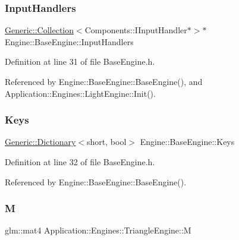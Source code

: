 \subsubsection{\texorpdfstring{Input\+Handlers}{InputHandlers}}
{\footnotesize\ttfamily \mbox{\hyperlink{classGeneric_1_1Collection}{Generic\+::\+Collection}}$<$Components\+::\+I\+Input\+Handler$\ast$$>$$\ast$ Engine\+::\+Base\+Engine\+::\+Input\+Handlers\hspace{0.3cm}{\ttfamily [inherited]}}



Definition at line 31 of file Base\+Engine.\+h.



Referenced by Engine\+::\+Base\+Engine\+::\+Base\+Engine(), and Application\+::\+Engines\+::\+Light\+Engine\+::\+Init().

\mbox{\label{classEngine_1_1BaseEngine_a65321a97e83f0a6ee90df3efac2d3307}} 
\subsubsection{\texorpdfstring{Keys}{Keys}}
{\footnotesize\ttfamily \mbox{\hyperlink{classGeneric_1_1Dictionary}{Generic\+::\+Dictionary}}$<$short, bool$>$ Engine\+::\+Base\+Engine\+::\+Keys\hspace{0.3cm}{\ttfamily [inherited]}}



Definition at line 32 of file Base\+Engine.\+h.



Referenced by Engine\+::\+Base\+Engine\+::\+Base\+Engine().

\mbox{\label{classApplication_1_1Engines_1_1TriangleEngine_a12ea2b98b8900cccf469e0bf0ea89316}} 
\subsubsection{\texorpdfstring{M}{M}}
{\footnotesize\ttfamily glm\+::mat4 Application\+::\+Engines\+::\+Triangle\+Engine\+::M\hspace{0.3cm}{\ttfamily [private]}}



